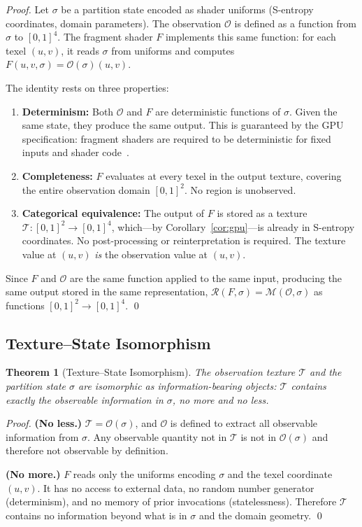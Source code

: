 \documentclass[11pt,twocolumn,a4paper]{article}
\newtheorem{theorem}{Theorem}[section]
\newcommand{\Obs}{\mathcal{O}}
\newcommand{\Rend}{\mathcal{R}}
\newcommand{\Meas}{\mathcal{M}}
\newcommand{\Tex}{\mathcal{T}}
\begin{document}
\begin{proof}
Let $\sigma$ be a partition state encoded as shader uniforms
(S-entropy coordinates, domain parameters).  The observation $\Obs$
is defined as a function from $\sigma$ to $[0,1]^4$.  The fragment
shader $F$ implements this same function: for each texel $(u,v)$, it
reads $\sigma$ from uniforms and computes
$F(u, v, \sigma) = \Obs(\sigma)(u,v)$.

The identity rests on three properties:
\begin{enumerate}[leftmargin=*,nosep]
\item \textbf{Determinism:} Both $\Obs$ and $F$ are deterministic
  functions of $\sigma$.  Given the same state, they produce the same
  output.  This is guaranteed by the GPU specification: fragment
  shaders are required to be deterministic for fixed inputs and shader
  code~\citep{khronosglsl}.

\item \textbf{Completeness:} $F$ evaluates at every texel in the
  output texture, covering the entire observation domain $[0,1]^2$.
  No region is unobserved.

\item \textbf{Categorical equivalence:} The output of $F$ is stored
  as a texture $\Tex : [0,1]^2 \to [0,1]^4$, which---by
  Corollary~\ref{cor:gpu}---is already in S-entropy coordinates.
  No post-processing or reinterpretation is required.  The texture
  value at $(u,v)$ \emph{is} the observation value at $(u,v)$.
\end{enumerate}

Since $F$ and $\Obs$ are the same function applied to the same input,
producing the same output stored in the same representation,
$\Rend(F,\sigma) = \Meas(\Obs,\sigma)$ as functions
$[0,1]^2 \to [0,1]^4$.  \qed
\end{proof}

\subsection{Texture--State Isomorphism}

\begin{theorem}[Texture--State Isomorphism]
\label{thm:texture-state}
The observation texture $\Tex$ and the partition state $\sigma$ are
isomorphic as information-bearing objects: $\Tex$ contains exactly the
observable information in $\sigma$, no more and no less.
\end{theorem}

\begin{proof}
\textbf{(No less.)}  $\Tex = \Obs(\sigma)$, and $\Obs$ is defined to
extract all observable information from $\sigma$.  Any observable
quantity not in $\Tex$ is not in $\Obs(\sigma)$ and therefore not
observable by definition.

\textbf{(No more.)}  $F$ reads only the uniforms encoding $\sigma$ and
the texel coordinate $(u,v)$.  It has no access to external data, no
random number generator (determinism), and no memory of prior
invocations (statelessness).  Therefore $\Tex$ contains no information
beyond what is in $\sigma$ and the domain geometry.  \qed
\end{proof}
\end{document}
